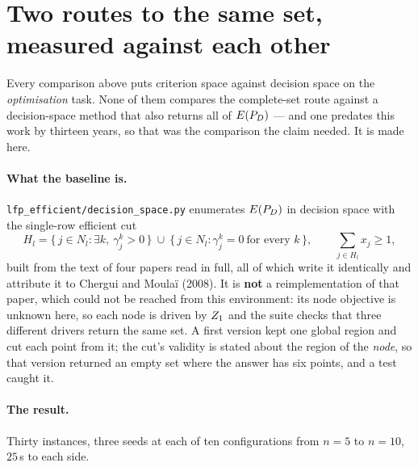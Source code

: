 \documentclass[11pt,a4paper]{article}
\begin{document}
\section{Two routes to the same set, measured against each other}
\label{sec:h2h}

Every comparison above puts criterion space against decision space on the
\emph{optimisation} task.  None of them compares the complete-set route
against a decision-space method that also returns all of $E(P_{D})$ --- and one
predates this work by thirteen years, so that was the comparison the claim
needed.  It is made here.

\paragraph{What the baseline is.}  \texttt{lfp\_efficient/decision\_space.py}
enumerates $E(P_{D})$ in decision space with the single-row efficient cut
\[
  H_l = \{\, j \in N_l : \exists k,\ \gamma^k_j > 0 \,\}
        \ \cup\
        \{\, j \in N_l : \gamma^k_j = 0 \ \text{for every } k \,\} ,
  \qquad \sum_{j \in H_l} x_j \geqslant 1 ,
\]
built from the text of four papers read in full, all of which write it
identically and attribute it to Chergui and Moula\"i (2008).  It is
\textbf{not} a reimplementation of that paper, which could not be reached from
this environment: its node objective is unknown here, so each node is driven by
$Z_1$ and the suite checks that three different drivers return the same set.
A first version kept one global region and cut each point from it; the cut's
validity is stated about the region of the \emph{node}, so that version
returned an empty set where the answer has six points, and a test caught it.

\paragraph{The result.}  Thirty instances, three seeds at each of ten
configurations from $n=5$ to $n=10$, $25$\,s to each side.
\end{document}

